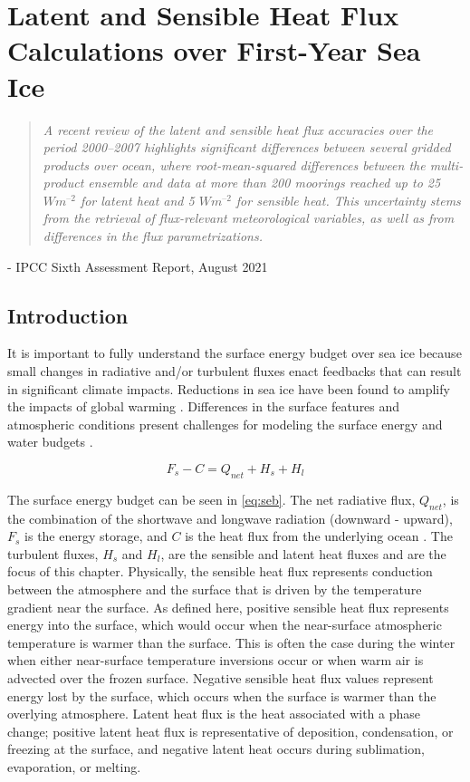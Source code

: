 \chapter{Latent and Sensible Heat Flux Calculations over First-Year Sea Ice}
\vspace{1 cm}
\begin{spacing}{1} \begin{quote} 
\noindent \emph{A recent review of the latent and sensible heat flux accuracies over the period 2000–2007 highlights significant differences between several gridded products over ocean, where root-mean-squared differences between the multi-product ensemble and data at more than 200  moorings reached up to 25 $W m^{–2}$ for latent heat and 5 $W m^{–2}$ for sensible heat. This uncertainty stems from the retrieval of flux-relevant meteorological variables, as well as from differences in the flux parametrizations.} \end{quote}
\hspace{6 cm} - IPCC Sixth Assessment Report, August 2021  
\end{spacing}
\doublespacing
\section{Introduction}

It is important to fully understand the surface energy budget over sea ice because small changes in radiative and/or turbulent fluxes enact feedbacks that can result in significant climate impacts. Reductions in sea ice have been found to amplify the impacts of global warming \citep{wunderling:2020, ipcc_techsum}. Differences in the surface features and atmospheric conditions present challenges for modeling the surface energy and water budgets \citep{wang:2009}. 

\begin{equation}\label{eq:seb}
F_{s} - C = Q_{net} + H_{s} + H_{l}
\end{equation}

The surface energy budget can be seen in \ref{eq:seb}. The net radiative flux, $Q_{net}$, is the combination of the shortwave and longwave radiation (downward - upward), $F_{s}$ is the energy storage, and $C$ is the heat flux from the underlying ocean \citep{walden:2017}. The turbulent fluxes, $H_{s}$ and $H_{l}$, are the sensible and latent heat fluxes and are the focus of this chapter. Physically, the sensible heat flux represents conduction between the atmosphere and the surface that is driven by the temperature gradient near the surface. As defined here, positive sensible heat flux represents energy into the surface, which would occur when the near-surface atmospheric temperature is warmer than the surface. This is often the case during the winter when either near-surface temperature inversions occur or when warm air is advected over the frozen surface. Negative sensible heat flux values represent energy lost by the surface, which occurs when the surface is warmer than the overlying atmosphere. Latent heat flux is the heat associated with a phase change; positive latent heat flux is representative of deposition, condensation, or freezing at the surface, and negative latent heat occurs during sublimation, evaporation, or melting.


